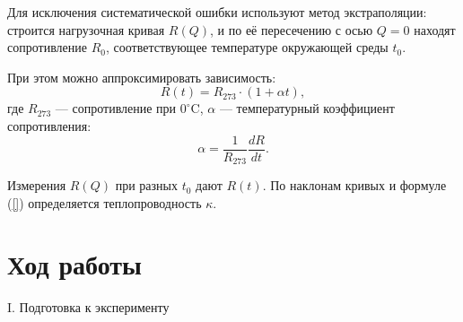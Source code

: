 \documentclass[a4paper,12pt]{article} %
\begin{document}
Для исключения систематической ошибки используют метод экстраполяции: строится нагрузочная кривая $R(Q)$, и по её пересечению с осью $Q=0$ находят сопротивление $R_0$, соответствующее температуре окружающей среды $t_0$.

При этом можно аппроксимировать зависимость:
\[
R(t) = R_{273} \cdot (1 + \alpha t),
\]
где $R_{273}$ — сопротивление при $0^\circ$C, $\alpha$ — температурный коэффициент сопротивления:
\[
\alpha = \frac{1}{R_{273}} \frac{dR}{dt}.
\]

Измерения $R(Q)$ при разных $t_0$ дают $R(t)$. По наклонам кривых и формуле (\ref{}) определяется теплопроводность $\kappa$.

\section*{Ход работы}
\begin{center}
  \textsf{I. Подготовка к эксперименту}
\end{center}
\end{document}
